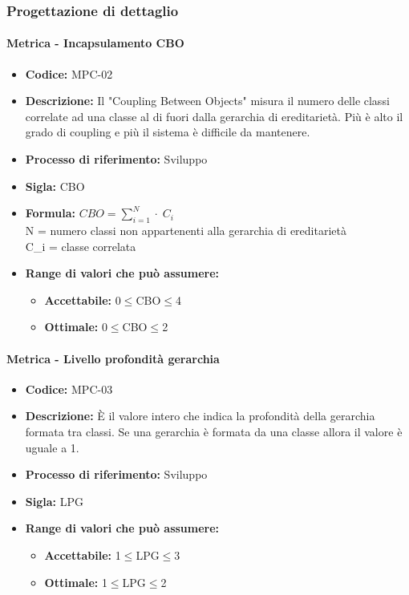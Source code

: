\subsubsection{Progettazione di dettaglio}
    \paragraph{Metrica - Incapsulamento CBO}
    \begin{itemize}
        \item \textbf{Codice:} MPC-02
        \item \textbf{Descrizione:} Il "Coupling Between Objects" misura il numero delle classi correlate ad una classe al di fuori dalla gerarchia di ereditarietà. Più è alto il grado di coupling e più il sistema è difficile da mantenere.
        \item \textbf{Processo di riferimento:} Sviluppo
        \item \textbf{Sigla:} CBO
        \item \textbf{Formula:} \begin{math}{CBO = {\sum_{i=1}^{N} \cdot \; C_i}}\end{math} \\ N = numero classi non appartenenti alla gerarchia di ereditarietà \\ C_i = classe correlata
        \item \textbf{Range di valori che può assumere:}
        \begin{itemize}
            \item \textbf{Accettabile:} 0$\leq$CBO$\leq$4
            \item \textbf{Ottimale:} 0$\leq$CBO$\leq$2
        \end{itemize}
    \end{itemize}

    \paragraph{Metrica - Livello profondità gerarchia}
    \begin{itemize}
        \item \textbf{Codice:} MPC-03
        \item \textbf{Descrizione:} È il valore intero che indica la profondità della gerarchia formata tra classi. Se una gerarchia è formata da una classe allora il valore è uguale a 1.
        \item \textbf{Processo di riferimento:} Sviluppo
        \item \textbf{Sigla:} LPG
        \item \textbf{Range di valori che può assumere:}
        \begin{itemize}
            \item \textbf{Accettabile:} 1$\leq$LPG$\leq$3
            \item \textbf{Ottimale:} 1$\leq$LPG$\leq$2
        \end{itemize}
    \end{itemize}

